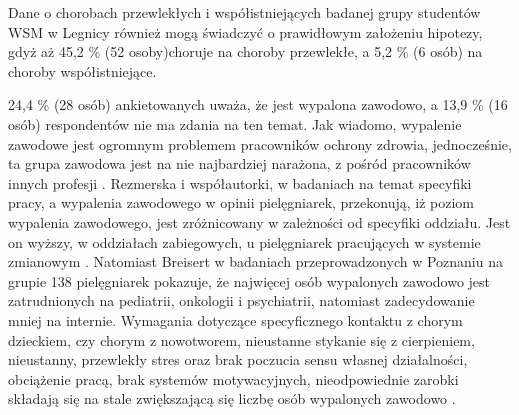 \documentclass[a4paper,12pt,twoside,openany]{report}
\begin{document}
Dane o chorobach przewlekłych i współistniejących badanej grupy  studentów WSM w Legnicy  również mogą świadczyć o prawidłowym założeniu hipotezy, gdyż aż 45,2 \%  (52 osoby)choruje na choroby przewlekłe, a 5,2 \% (6 osób) na choroby współistniejące.


24,4 \%  (28 osób) ankietowanych uważa, że jest wypalona zawodowo, a 13,9 \% (16 osób) respondentów nie ma zdania na ten temat. Jak wiadomo, wypalenie zawodowe jest ogromnym problemem pracowników ochrony zdrowia, jednocześnie, ta grupa zawodowa jest na nie najbardziej narażona,  z pośród pracowników innych profesji \cite{wypal}. Rezmerska i współautorki, w badaniach na temat specyfiki pracy, a wypalenia zawodowego w opinii pielęgniarek,  przekonują, iż poziom wypalenia zawodowego, jest zróżnicowany w zależności od specyfiki oddziału. Jest on wyższy, w oddziałach zabiegowych, u pielęgniarek pracujących w systemie zmianowym \cite{zmiany}. Natomiast Breisert w badaniach przeprowadzonych w Poznaniu na grupie 138 pielęgniarek pokazuje, że najwięcej osób wypalonych zawodowo jest zatrudnionych na pediatrii, onkologii i psychiatrii, natomiast zadecydowanie mniej na internie. Wymagania dotyczące specyficznego kontaktu z chorym dzieckiem, czy chorym z nowotworem, nieustanne stykanie się z cierpieniem, nieustanny, przewlekły stres oraz brak poczucia sensu  własnej działalności, obciążenie pracą, brak systemów motywacyjnych, nieodpowiednie zarobki składają się na stale zwiększającą się liczbę osób wypalonych zawodowo \cite{breisert}.
\end{document}
